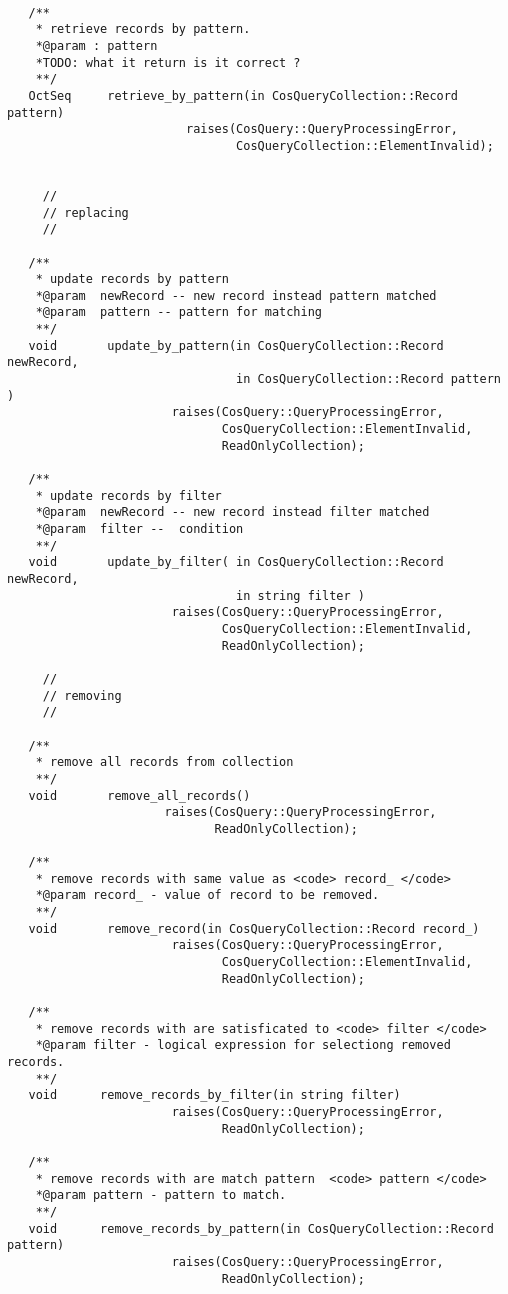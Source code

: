 \documentclass[10pt]{article}
\begin{document}
\begin{verbatim}
   
   /**
    * retrieve records by pattern.
    *@param : pattern
    *TODO: what it return is it correct ?
    **/
   OctSeq     retrieve_by_pattern(in CosQueryCollection::Record pattern)
                         raises(CosQuery::QueryProcessingError,
                                CosQueryCollection::ElementInvalid);


     //
     // replacing
     //

   /**
    * update records by pattern
    *@param  newRecord -- new record instead pattern matched
    *@param  pattern -- pattern for matching 
    **/
   void       update_by_pattern(in CosQueryCollection::Record newRecord, 
                                in CosQueryCollection::Record pattern ) 
                       raises(CosQuery::QueryProcessingError,
                              CosQueryCollection::ElementInvalid,
                              ReadOnlyCollection);

   /**
    * update records by filter
    *@param  newRecord -- new record instead filter matched
    *@param  filter --  condition
    **/
   void       update_by_filter( in CosQueryCollection::Record newRecord, 
                                in string filter )
                       raises(CosQuery::QueryProcessingError,
                              CosQueryCollection::ElementInvalid,
                              ReadOnlyCollection);

     //
     // removing
     //

   /**
    * remove all records from collection
    **/
   void       remove_all_records()
                      raises(CosQuery::QueryProcessingError,
                             ReadOnlyCollection);

   /**
    * remove records with same value as <code> record_ </code>
    *@param record_ - value of record to be removed.
    **/
   void       remove_record(in CosQueryCollection::Record record_)
                       raises(CosQuery::QueryProcessingError,
                              CosQueryCollection::ElementInvalid,
                              ReadOnlyCollection);

   /**
    * remove records with are satisficated to <code> filter </code>
    *@param filter - logical expression for selectiong removed records.
    **/
   void      remove_records_by_filter(in string filter)
                       raises(CosQuery::QueryProcessingError,
                              ReadOnlyCollection);

   /**
    * remove records with are match pattern  <code> pattern </code>
    *@param pattern - pattern to match.
    **/
   void      remove_records_by_pattern(in CosQueryCollection::Record pattern)
                       raises(CosQuery::QueryProcessingError,
                              ReadOnlyCollection);


\end{verbatim}
\end{document}
